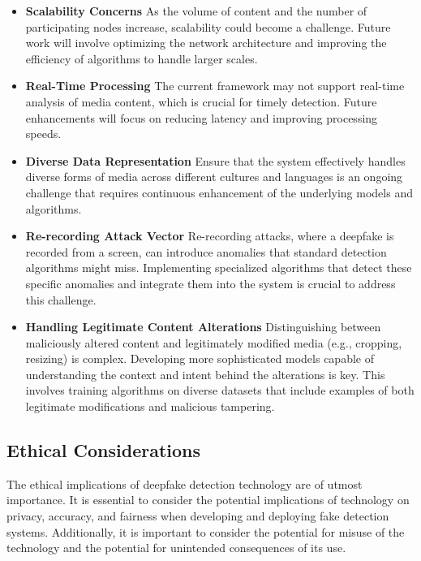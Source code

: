 \documentclass{article}
\begin{document}
\begin{itemize}
    \item \textbf{Scalability Concerns} As the volume of content and the number of participating nodes increase, scalability could become a challenge. Future work will involve optimizing the network architecture and improving the efficiency of algorithms to handle larger scales.
    \item \textbf{Real-Time Processing} The current framework may not support real-time analysis of media content, which is crucial for timely detection. Future enhancements will focus on reducing latency and improving processing speeds.
    \item \textbf{Diverse Data Representation} Ensure that the system effectively handles diverse forms of media across different cultures and languages is an ongoing challenge that requires continuous enhancement of the underlying models and algorithms.
    \item \textbf{Re-recording Attack Vector} Re-recording attacks, where a deepfake is recorded from a screen, can introduce anomalies that standard detection algorithms might miss. Implementing specialized algorithms that detect these specific anomalies and integrate them into the system is crucial to address this challenge.
    \item \textbf{Handling Legitimate Content Alterations} Distinguishing between maliciously altered content and legitimately modified media (e.g., cropping, resizing) is complex. Developing more sophisticated models capable of understanding the context and intent behind the alterations is key. This involves training algorithms on diverse datasets that include examples of both legitimate modifications and malicious tampering.
\end{itemize}

\subsection{Ethical Considerations}

The ethical implications of deepfake detection technology are of utmost importance. It is essential to consider the potential implications of technology on privacy, accuracy, and fairness when developing and deploying fake detection systems. Additionally, it is important to consider the potential for misuse of the technology and the potential for unintended consequences of its use.
\end{document}
